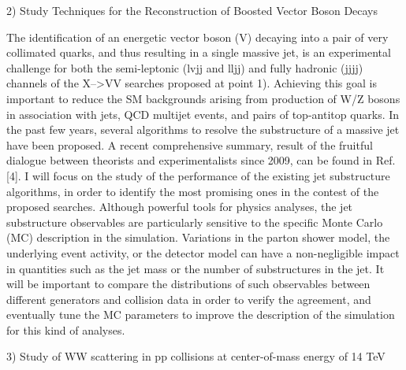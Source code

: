 \documentclass[10pt, a4paper]{article}
\begin{document}
2) Study Techniques for the Reconstruction of Boosted Vector Boson Decays

The identification of an energetic vector boson (V) decaying into a pair of very collimated quarks, and thus resulting in a single massive jet, is an experimental challenge for both the semi-leptonic (lvjj and lljj) and fully hadronic (jjjj) channels of the X-->VV searches proposed at point 1). Achieving this goal is important to reduce the SM backgrounds arising from production of W/Z bosons in association with jets, QCD multijet events, and pairs of top-antitop quarks. In the past few years, several algorithms to resolve the substructure of a massive jet have been proposed. A recent comprehensive summary, result of the fruitful dialogue between theorists and experimentalists since 2009, can be found in Ref. [4]. 
I will focus on the study of the performance of the existing jet substructure algorithms, in order to identify the most promising ones in the contest of the proposed searches. Although powerful tools for physics analyses, the jet substructure observables are particularly sensitive to the specific Monte Carlo (MC) description in the simulation. Variations in the parton shower model, the underlying event activity, or the detector model can have a non-negligible impact in quantities such as the jet mass or the number of substructures in the jet. It will be important to compare the distributions of such observables between different generators and collision data in order to verify the agreement, and eventually tune the MC parameters to improve the description of the simulation for this kind of analyses.

3) Study of WW scattering in pp collisions at center-of-mass energy of 14 TeV 
\end{document}

